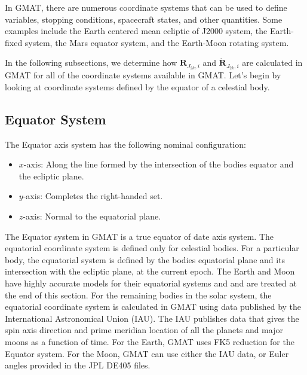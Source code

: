 {In GMAT, there are numerous coordinate systems that can be used to
define variables, stopping conditions, spacecraft states, and other
quantities.  Some examples include the Earth centered mean ecliptic
of J2000 system, the Earth-fixed system, the Mars equator system,
and the Earth-Moon rotating system.

In the following subsections, we determine how
$\mathbf{R}_{J_{2k},i}$ and $\dot{\mathbf{R}}_{J_{2k},i}$ are
calculated in GMAT for all of the coordinate systems available in
GMAT.  Let's begin by looking at coordinate systems defined by the
equator of a celestial body.

\subsection{Equator System}  \label{Sec:Equator} 

The Equator axis system has the following nominal configuration:
%
\begin{itemize}
\item $x$-axis:  Along the line formed by the intersection of the bodies equator and the ecliptic plane.
%
\item $y$-axis:  Completes the right-handed set.
%
\item $z$-axis:  Normal to the  equatorial plane.
\end{itemize}
%
The Equator system in GMAT is a true equator of date axis system.
The equatorial coordinate system is defined only for celestial
bodies. For a particular body, the equatorial system is defined by
the bodies equatorial plane and its intersection with the ecliptic
plane, at the current epoch.   The Earth and Moon have highly
accurate models for their equatorial systems and and are treated at
the end of this section. For the remaining bodies in the solar
system, the equatorial coordinate system is calculated in GMAT using
data published by the International Astronomical Union
(IAU)\cite{Seidelmann:etal:02}. The IAU publishes data that gives
the spin axis direction and prime meridian location of all the
planets and major moons as a function of time.  For the Earth, GMAT
uses FK5 reduction for the Equator system.  For the Moon, GMAT can
use either the IAU data, or Euler angles provided in the JPL DE405
files.

}
